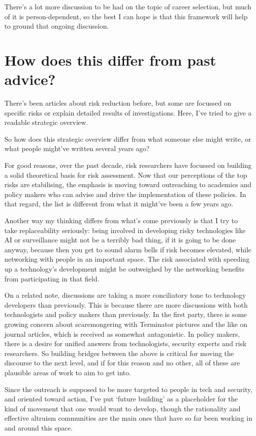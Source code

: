 ﻿\documentclass[12pt]{article}
\begin{document}
There's a lot more discussion to be had on the topic of career selection, but much of it is person-dependent, so the best I can hope is that this framework will help to ground that ongoing discussion.

\section{How does this differ from past advice?}
There's been articles about risk reduction before, but some are focussed on specific risks or explain detailed results of investigations. Here, I've tried to give a readable strategic overview.

So how does this strategic overview differ from what someone else might write, or what people might've written several years ago?

For good reasons, over the past decade, risk researchers have focussed on building a solid theoretical basis for risk 
assessment. Now that our perceptions of the top risks are stabilising, the emphasis is moving toward outreaching to academics and 
policy makers who can advise and drive the implementation of these policies. In that regard, the list is different from what it might've been a few years ago.

Another way my thinking differs from what's come previously is that I try to take replaceability seriously: being involved in developing risky technologies like AI or surveillance might not be a terribly bad thing, if it is going to be done anyway, because then you get to sound alarm bells if risk becomes elevated, while networking with people in an important space. The risk associated with speeding up a technology's development might be outweighed by the networking benefits from participating in that field.

On a related note, discussions are taking a more conciliatory tone to technology developers than previously. This is because 
there are more discussions with both technologists and policy makers than previously. In the first party, there is some growing concern about scaremongering with Terminator pictures and the like on journal articles, which is received as somewhat antagonistic. In policy makers, there is a desire for unified answers from technologists, security experts and risk researchers. So building bridges between the above is critical for moving the discourse to the next level, and if for this reason and no other, all of these are plausible areas of work to aim to get into.

Since the outreach is supposed to be more targeted to people in tech and security, and oriented toward action, I've put `future building' as a placeholder for the kind of movement that one would want to develop, though the rationality and effective altruism communities are the main ones that have so far been working in and around this space.
\end{document}

